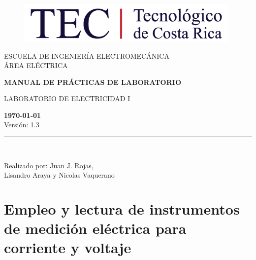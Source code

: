 \documentclass[12pt,letterpaper]{report}
\begin{document}
\begin{titlepage}

\begin{center}
\vspace*{1in}
\begin{figure}[htb]
\begin{center}
\includegraphics[width=11cm]{logo}
\end{center}
\end{figure}
\vspace*{0.4in}
\begin{Large}
ESCUELA DE INGENIERÍA ELECTROMECÁNICA\\
\vspace*{0.15in}
ÁREA ELÉCTRICA\\
\vspace*{0.8in}
\end{Large}
\vspace*{0.2in}
\begin{Large}
\textbf{MANUAL DE PRÁCTICAS DE LABORATORIO} \\
\end{Large}
\vspace*{0.3in}
\begin{large}
LABORATORIO DE ELECTRICIDAD I\\
\end{large}
\vspace*{2.5in}
\begin{Large}
\textbf{\today}\\
Versión: 1.3\\
\end{Large}
\rule{80mm}{0.1mm}\\
\vspace*{0.1in}
\begin{large}
Realizado por: Juan J. Rojas, \\
Lisandro Araya y Nicolas Vaquerano\\
\end{large}
\end{center}

\end{titlepage}

\tableofcontents

\chapter{Empleo y lectura de instrumentos de medición eléctrica para corriente y voltaje}
\end{document}
